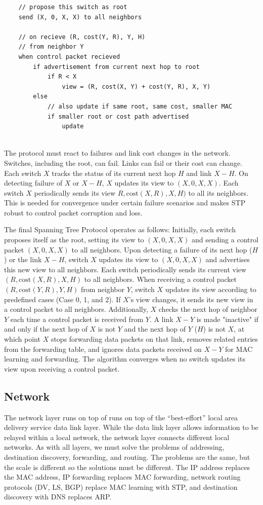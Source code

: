 \begin{lstlisting}
    // propose this switch as root
    send (X, 0, X, X) to all neighbors

    // on recieve (R, cost(Y, R), Y, H)
    // from neighbor Y
    when control packet recieved
        if advertisement from current next hop to root
            if R < X
                view = (R, cost(X, Y) + cost(Y, R), X, Y)
        else 
            // also update if same root, same cost, smaller MAC
            if smaller root or cost path advertised
                update
            
\end{lstlisting}

The protocol must react to failures and link cost changes in
the network. Switches, including the root, can fail. Links can
fail or their cost can change.
Each switch $X$ tracks the status of
its current next hop $H$ and link
$X-H$. On detecting failure of $X$ or
$X-H$, $X$ updates its view to
$(X, 0, X, X)$.
Each switch $X$
periodically sends its view $R, \text{cost}(X, R), X, H)$
to all its neighbors. This is
needed for convergence under certain
failure scenarios and makes STP robust
to control packet corruption and loss.

The final Spanning Tree Protocol
operates as follows: Initially,
each switch proposes itself as the root,
setting its view to $(X, 0, X, X)$ and
sending a control packet $(X, 0, X, X)$
to all neighbors. Upon detecting a failure
of its next hop ($H$) or the link $X-H$,
switch $X$ updates its view to $(X, 0, X, X)$
and advertises this new view to all neighbors.
Each switch periodically sends its current
view $(R, \text{cost}(X, R), X, H)$ to all neighbors.
When receiving a control packet $(R, \text{cost}(Y, R), Y, H)$
from neighbor $Y$, switch $X$ updates its view according to
predefined cases (Case 0, 1, and 2). If $X$'s view changes,
it sends its new view in a control packet to all neighbors.
Additionally, $X$ checks the next hop of neighbor $Y$ each
time a control packet is received from $Y$. A link $X-Y$ is
made "inactive" if and only if the next hop of $X$ is not $Y$
and the next hop of $Y$ ($H$) is not $X$, at which point $X$
stops forwarding data packets on that link, removes related
entries from the forwarding table, and ignores data packets
received on $X-Y$ for MAC learning and forwarding. The
algorithm converges when no switch updates its view upon
receiving a control packet.

\subsection{Network}
The network layer runs on top of runs on top of the
“best-effort” local area delivery service data link
layer. While the data link layer allows
information to be relayed within a local
network, the network layer connects
different local networks. As with all
layers, we must solve the problems
of addressing, destination discovery,
forwarding, and routing. The problems
are the same, but the scale is different
so the solutions must be different.
The IP address replaces the MAC
address, IP forwarding replaces MAC
forwarding, network routing protocols
(DV, LS, BGP) replace MAC learning
with STP, and destination discovery
with DNS replaces ARP.

